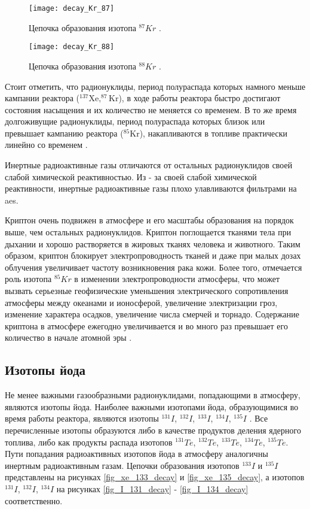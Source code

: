 \begin{figure}[ht!]
    \centering
    \texttt{[image: decay\_Kr\_87]}
    \captionsetup{justification=centering}
    \caption{Цепочка образования изотопа $^{87}Kr$ \cite{periodic_table}.}
    \label{fig_kr_87_decay}
\end{figure}

\begin{figure}[ht!]
    \centering
    \texttt{[image: decay\_Kr\_88]}
    \captionsetup{justification=centering}
    \caption{Цепочка образования изотопа $^{88}Kr$ \cite{periodic_table}.}
    \label{fig_kr_88_decay}
\end{figure}

Стоит отметить, что радионуклиды, период полураспада которых намного меньше кампании реактора ($^{137}\text{Xe}, 
^{87}\text{Kr}$), в ходе работы реактора быстро достигают состояния насыщения и их количество не меняется со временем. В 
то же время долгоживущие радионуклиды, период полураспада которых близок или превышает кампанию реактора 
($^{85}\text{Kr}$), накапливаются в топливе практически линейно со временем \cite{naumov_security}.

Инертные радиоактивные газы отличаются от остальных радионуклидов своей слабой химической реактивностью. Из - за своей 
слабой химической реактивности, инертные радиоактивные газы плохо улавливаются фильтрами на \ac{aes}. 

Криптон очень подвижен в атмосфере и его масштабы образования на порядок выше, чем остальных радионуклидов. Криптон 
поглощается тканями тела при дыхании и хорошо растворяется в жировых тканях человека и животного. Таким образом, криптон 
блокирует электропроводность тканей и даже при малых дозах облучения увеличивает частоту возникновения рака кожи. 
Более того, отмечается роль изотопа $^{85}Kr$ в изменении электропроводности атмосферы, что может вызвать серьезные 
геофизические уменьшения электрического сопротивления атмосферы между океанами и ионосферой, увеличение электризации 
гроз, изменение характера осадков, увеличение числа смерчей и торнадо. Содержание криптона в атмосфере ежегодно 
увеличивается и во много раз превышает его количество в начале атомной эры \cite{bekman_nuclear}.


\subsection{Изотопы йода}

Не менее важными газообразными радионуклидами, попадающими в атмосферу, являются изотопы йода. Наиболее важными изотопами 
йода, образующимися во время работы реактора, являются изотопы $^{131}I$, $^{132}I$, $^{133}I$, $^{134}I$, $^{135}I$ 
\cite{gusev_bio}. Все перечисленные изотопы образуются либо в качестве продуктов деления ядерного топлива, либо как 
продукты распада изотопов $^{131}Te$, $^{132}Te$, $^{133}Te$, $^{134}Te$, $^{135}Te$. Пути попадания радиоактивных 
изотопов йода в атмосферу аналогичны инертным радиоактивным газам. Цепочки образования изотопов $^{133}I$ и $^{135}I$ 
представлены на рисунках \ref{fig_xe_133_decay} и \ref{fig_xe_135_decay}, а изотопов $^{131}I$, $^{132}I$, $^{134}I$ 
на рисунках \ref{fig_I_131_decay} - \ref{fig_I_134_decay} соответственно.

